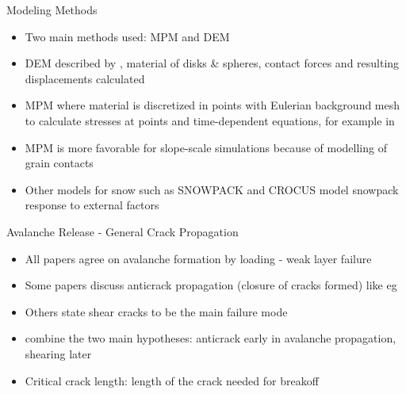 \documentclass[11pt,aspectratio=169]{beamer}
\begin{document}
\begin{frame}{Modeling Methods}
    \begin{itemize}
        \item Two main methods used: MPM and DEM
        \item DEM described by \cite{cundallDiscreteNumericalModel1979}, material of disks \& spheres, contact forces and resulting displacements calculated
        \item MPM where material is discretized in points with Eulerian background mesh to calculate stresses at points and time-dependent equations, for example in \cite{gaumeDynamicAnticrackPropagation2018}
        \item MPM is more favorable for slope-scale simulations because of modelling of grain contacts
        \item Other models for snow such as SNOWPACK \parencite{barteltPhysicalSNOWPACKModel2002} and CROCUS \parencite{brunNumericalModelSimulate1992} model snowpack response to external factors
    \end{itemize}
    
\end{frame}


\begin{frame}{Avalanche Release - General Crack Propagation}
    \begin{itemize}
        \item All papers agree on avalanche formation by loading - weak layer failure
        \item Some papers discuss anticrack propagation (closure of cracks formed) like eg \cite{gaumeDynamicAnticrackPropagation2018}
        \item Others state shear cracks to be the main failure mode
        \item \cite{bergfeldSignaturesSubRayleighSupershear2025} combine the two main hypotheses: anticrack early in avalanche propagation, shearing later 
        \item Critical crack length: length of the crack needed for breakoff \parencite{gaumeSnowFractureRelation2017a}
    \end{itemize}
\end{frame}
\end{document}
